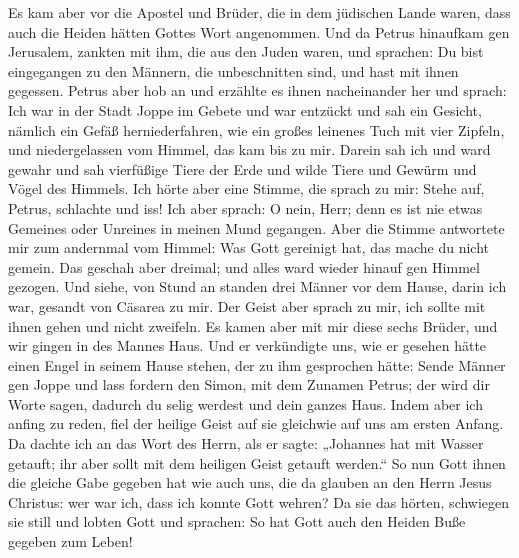  Es kam aber vor die Apostel und Brüder, die in dem
jüdischen Lande waren, dass auch die Heiden hätten Gottes Wort
angenommen.  Und da Petrus hinaufkam gen Jerusalem,
zankten mit ihm, die aus den Juden waren,  und sprachen:
Du bist eingegangen zu den Männern, die unbeschnitten sind, und hast mit
ihnen gegessen.  Petrus aber hob an und erzählte es ihnen
nacheinander her und sprach:  Ich war in der Stadt Joppe
im Gebete und war entzückt und sah ein Gesicht, nämlich ein Gefäß
herniederfahren, wie ein großes leinenes Tuch mit vier Zipfeln, und
niedergelassen vom Himmel, das kam bis zu mir.  Darein sah
ich und ward gewahr und sah vierfüßige Tiere der Erde und wilde Tiere
und Gewürm und Vögel des Himmels.  Ich hörte aber eine
Stimme, die sprach zu mir: Stehe auf, Petrus, schlachte und iss!
 Ich aber sprach: O nein, Herr; denn es ist nie etwas
Gemeines oder Unreines in meinen Mund gegangen.  Aber die
Stimme antwortete mir zum andernmal vom Himmel: Was Gott gereinigt hat,
das mache du nicht gemein.  Das geschah aber dreimal; und
alles ward wieder hinauf gen Himmel gezogen.  Und siehe,
von Stund an standen drei Männer vor dem Hause, darin ich war, gesandt
von Cäsarea zu mir.  Der Geist aber sprach zu mir, ich
sollte mit ihnen gehen und nicht zweifeln. Es kamen aber mit mir diese
sechs Brüder, und wir gingen in des Mannes Haus.  Und er
verkündigte uns, wie er gesehen hätte einen Engel in seinem Hause
stehen, der zu ihm gesprochen hätte: Sende Männer gen Joppe und lass
fordern den Simon, mit dem Zunamen Petrus;  der wird dir
Worte sagen, dadurch du selig werdest und dein ganzes Haus.
 Indem aber ich anfing zu reden, fiel der heilige Geist
auf sie gleichwie auf uns am ersten Anfang.  Da dachte
ich an das Wort des Herrn, als er sagte: „Johannes hat mit Wasser
getauft; ihr aber sollt mit dem heiligen Geist getauft werden.``
 So nun Gott ihnen die gleiche Gabe gegeben hat wie auch
uns, die da glauben an den Herrn Jesus Christus: wer war ich, dass ich
konnte Gott wehren?  Da sie das hörten, schwiegen sie
still und lobten Gott und sprachen: So hat Gott auch den Heiden Buße
gegeben zum Leben!

